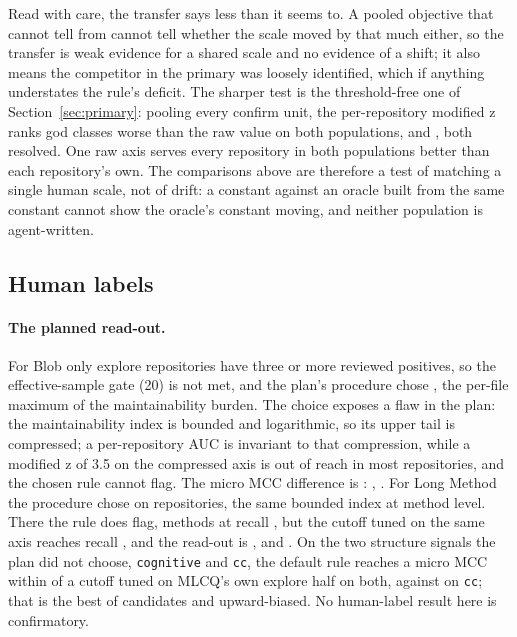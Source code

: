 \documentclass[11pt,a4paper]{article}
\newcommand{\sig}[1]{\texttt{#1}}
\begin{document}
Read with care, the transfer says less than it seems to. A pooled objective
that cannot tell \transferMainOwnCut{} from \transferMlcqOwnCut{} cannot tell
whether the scale moved by that much either, so the transfer is weak evidence
for a shared scale and no evidence of a shift; it also means the competitor
in the primary was loosely identified, which if anything understates the
rule's deficit. The sharper test is the threshold-free one of
Section~\ref{sec:primary}: pooling every confirm unit, the per-repository
modified z ranks god classes worse than the raw value on both populations,
\primPooledAucDiff{} \primPooledAucDiffCI{} and \mlcqPmdPooledAucDiff{}
\mlcqPmdPooledAucDiffCI{}, both resolved. One raw axis serves every
repository in both populations better than each repository's own. The
comparisons above are therefore a test of matching a single human scale, not
of drift: a constant against an oracle built from the same constant cannot
show the oracle's constant moving, and neither population is agent-written.

\subsection{Human labels}
\label{sec:human}

\paragraph{The planned read-out.} For Blob only \humBlobAllMinPosEx{} explore
repositories have three or more reviewed positives, so the effective-sample
gate (20) is not met, and the plan's procedure chose \humBlobAllSignal{}, the
per-file maximum of the maintainability burden. The choice exposes a flaw in
the plan: the maintainability index is bounded and logarithmic, so its upper
tail is compressed; a per-repository AUC is invariant to that compression,
while a modified z of 3.5 on the compressed axis is out of reach in most
repositories, and the chosen rule cannot flag. The micro MCC difference is
\humBlobAllMicroMcc{} \humBlobAllMicroMccCI{}: \textbf{\humBlobAllVerdict},
\humBlobAllPowered{}. For Long Method the procedure chose
\humLongMethodAllSignal{} on \humLongMethodAllMinPosEx{} repositories, the
same bounded index at method level. There the rule does flag,
\humLongMethodAllRelFlagged{} methods at recall \humLongMethodAllRelRecall{},
but the cutoff tuned on the same axis reaches recall
\humLongMethodAllAbsRecall{}, and the read-out is \humLongMethodAllMicroMcc{}
\humLongMethodAllMicroMccCI{}, \textbf{\humLongMethodAllVerdict} and
\humLongMethodAllPowered{}. On the two
structure signals the plan did not choose, \sig{cognitive} and \sig{cc}, the
default rule reaches a micro MCC within \humCandLongMethodMaxGap{} of a cutoff
tuned on MLCQ's own explore half on both, \humCandLongMethodCcRelMicroMcc{}
against \humCandLongMethodCcAbsMicroMcc{} on \sig{cc}; that is the best of
\humCandLongMethodN{} candidates and upward-biased. No human-label result here is confirmatory.
\end{document}
